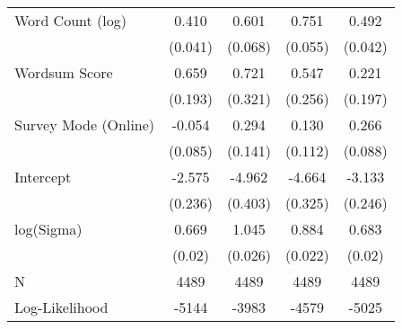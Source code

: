 \begin{table}[ht]
\begin{tabular}{lcccc}
  Word Count (log) &  0.410 &  0.601 &  0.751 &  0.492 \\ 
   & (0.041) & (0.068) & (0.055) & (0.042) \\ 
  Wordsum Score &  0.659 &  0.721 &  0.547 &  0.221 \\ 
   & (0.193) & (0.321) & (0.256) & (0.197) \\ 
  Survey Mode (Online) & -0.054 &  0.294 &  0.130 &  0.266 \\ 
   & (0.085) & (0.141) & (0.112) & (0.088) \\ 
  Intercept & -2.575 & -4.962 & -4.664 & -3.133 \\ 
   & (0.236) & (0.403) & (0.325) & (0.246) \\ 
  log(Sigma) &  0.669 &  1.045 &  0.884 &  0.683 \\ 
   & (0.02) & (0.026) & (0.022) & (0.02) \\ 
   \hline
N & 4489 & 4489 & 4489 & 4489 \\ 
  Log-Likelihood & -5144 & -3983 & -4579 & -5025 \\ 
   \hline
\end{tabular}
\endgroup
\end{table}

